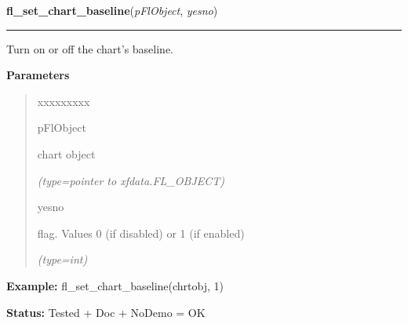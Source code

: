 \hspace{.8\funcindent}\begin{boxedminipage}{\funcwidth}

    \raggedright \textbf{fl\_set\_chart\_baseline}(\textit{pFlObject}, \textit{yesno})

    \vspace{-1.5ex}

    \rule{\textwidth}{0.5\fboxrule}
\setlength{\parskip}{2ex}
    Turn on or off the chart's baseline.

\setlength{\parskip}{1ex}
      \textbf{Parameters}
      \vspace{-1ex}

      \begin{quote}
        \begin{Ventry}{xxxxxxxxx}

          \item[pFlObject]

          chart object

            {\it (type=pointer to xfdata.FL\_OBJECT)}

          \item[yesno]

          flag. Values 0 (if disabled) or 1 (if enabled)

            {\it (type=int)}

        \end{Ventry}

      \end{quote}

\textbf{Example:} fl\_set\_chart\_baseline(chrtobj, 1)



\textbf{Status:} Tested + Doc + NoDemo = OK



    \end{boxedminipage}

    \label{xformslib:flchart:fl_set_chart_lcolor}

    \vspace{0.5ex}

